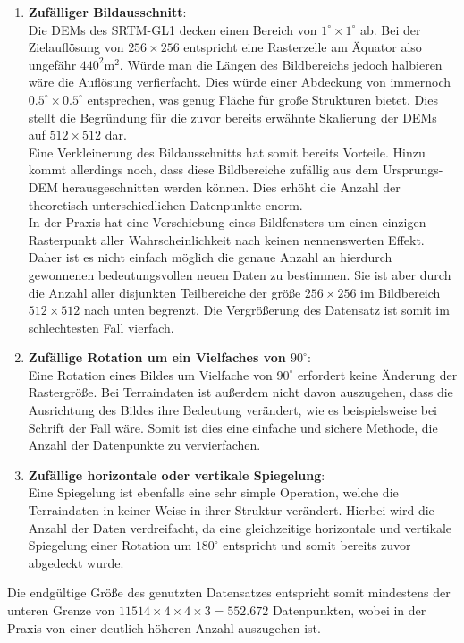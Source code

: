 \begin{enumerate}
    \item \textbf{Zufälliger Bildausschnitt}: \\
    Die \ac{DEM}s des SRTM-GL1 decken einen Bereich von $1^{\circ}\times1^{\circ}$ ab. Bei der Zielauflösung von $256\times256$ entspricht eine Rasterzelle am Äquator also ungefähr $440^2\text{m}^2$. Würde man die Längen des Bildbereichs jedoch halbieren wäre die Auflösung verfierfacht. Dies würde einer Abdeckung von immernoch $0.5^{\circ}\times0.5^{\circ}$ entsprechen, was genug Fläche für große Strukturen bietet. Dies stellt die Begründung für die zuvor bereits erwähnte Skalierung der \ac{DEM}s auf $512\times512$ dar. \\ 
    Eine Verkleinerung des Bildausschnitts hat somit bereits Vorteile. Hinzu kommt allerdings noch, dass diese Bildbereiche zufällig aus dem Ursprungs-DEM herausgeschnitten werden können. Dies erhöht die Anzahl der theoretisch unterschiedlichen Datenpunkte enorm. \\
    In der Praxis hat eine Verschiebung eines Bildfensters um einen einzigen Rasterpunkt aller Wahrscheinlichkeit nach keinen nennenswerten Effekt. Daher ist es nicht einfach möglich die genaue Anzahl an hierdurch gewonnenen bedeutungsvollen neuen Daten zu bestimmen. Sie ist aber durch die Anzahl aller disjunkten Teilbereiche der größe $256\times256$ im Bildbereich $512\times512$ nach unten begrenzt. Die Vergrößerung des Datensatz ist somit im schlechtesten Fall vierfach.
    \item \textbf{Zufällige Rotation um ein Vielfaches von $90^{\circ}$}: \\
    Eine Rotation eines Bildes um Vielfache von $90^{\circ}$ erfordert keine Änderung der Rastergröße. Bei Terraindaten ist außerdem nicht davon auszugehen, dass die Ausrichtung des Bildes ihre Bedeutung verändert, wie es beispielsweise bei Schrift der Fall wäre. Somit ist dies eine einfache und sichere Methode, die Anzahl der Datenpunkte zu vervierfachen.
    \item \textbf{Zufällige horizontale oder vertikale Spiegelung}: \\
    Eine Spiegelung ist ebenfalls eine sehr simple Operation, welche die Terraindaten in keiner Weise in ihrer Struktur verändert. Hierbei wird die Anzahl der Daten verdreifacht, da eine gleichzeitige horizontale und vertikale Spiegelung einer Rotation um $180^{\circ}$ entspricht und somit bereits zuvor abgedeckt wurde. 
\end{enumerate}
Die endgültige Größe des genutzten Datensatzes entspricht somit mindestens der unteren Grenze von $11514\times4\times4\times3 = 552.672$ Datenpunkten, wobei in der Praxis von einer deutlich höheren Anzahl auszugehen ist.


